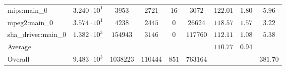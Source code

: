 \begin{tabular}{|l|c|c|c|c|c|c|c|c|}
mips:main\_0            & $ 3.240 \cdot 10^{1} $ & $ 3953    $ & $ 2721   $ & $ 16  $ & $ 3072   $ & $ 122.01      $ & $ 1.80    $ & $ 5.96    $ \\
mpeg2:main\_0           & $ 3.574 \cdot 10^{1} $ & $ 4238    $ & $ 2445   $ & $ 0   $ & $ 26624  $ & $ 118.57      $ & $ 1.57    $ & $ 3.22    $ \\
sha\_driver:main\_0     & $ 1.382 \cdot 10^{3} $ & $ 154943  $ & $ 3146   $ & $ 0   $ & $ 117760 $ & $ 112.11      $ & $ 1.08    $ & $ 5.38    $ \\
\hline
Average                 & $                    $ & $         $ & $        $ & $     $ & $        $ & $ 110.77      $ & $ 0.94    $ & $         $ \\
\hline
Overall                 & $ 9.483 \cdot 10^{3} $ & $ 1038223 $ & $ 110444 $ & $ 851 $ & $ 763164 $ & $             $ & $         $ & $ 381.70  $ \\
\hline
\end{tabular}

